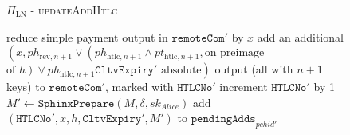 \begin{figure}[H]
\begin{protocolbox}{$\Pi_{\mathrm{LN}}$ - \textsc{updateAddHtlc}}
\begin{algorithmic}[1]
            \State reduce simple payment output in $\mathtt{remoteCom}'$ by $x$
            \State add an additional $\left(x, ph_{\mathrm{rev}, n+1} \vee
            \left(ph_{\mathrm{htlc}, n+1} \wedge pt_{\mathrm{htlc}, n+1}, \text{
            on preimage}\right.\right.$ $\left.\left.\text{of } h\right) \vee
            ph_{\mathrm{htlc}, n+1}\mathtt{CltvExpiry}' \text{ absolute}\right)$
            output (all with $n+1$ keys) to $\mathtt{remoteCom}'$, marked with
            $\texttt{HTLCNo}'$
            \State increment $\texttt{HTLCNo}'$ by 1
            \State $M' \gets \mathtt{SphinxPrepare}\left(M, \delta,
            sk_{\mathit{Alice}}\right)$
            \State add $\left(\mathtt{HTLCNo}', x, h, \mathtt{CltvExpiry}',
            M'\right)$ to $\mathtt{pendingAdds}_{\mathit{pchid}'}$
          \EndIf
        \EndIndent
      \end{algorithmic}
    \end{protocolbox}
    \caption{}
    \label{alg:protocol:pay:updateAddHtlc}
  \end{figure}

